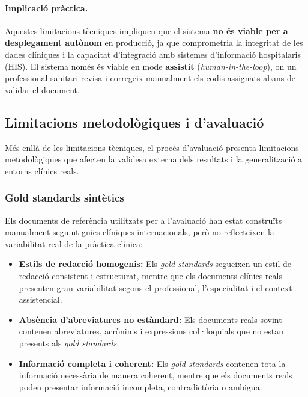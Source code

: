\documentclass[CAT]{TFUOC}%
\begin{document}
\paragraph{Implicació pràctica.}
Aquestes limitacions tècniques impliquen que el sistema \textbf{no és viable per a desplegament autònom} en producció, ja que comprometria la integritat de les dades clíniques i la capacitat d'integració amb sistemes d'informació hospitalaris (HIS). El sistema només és viable en mode \textbf{assistit} (\textit{human-in-the-loop}), on un professional sanitari revisa i corregeix manualment els codis assignats abans de validar el document.

\subsection{Limitacions metodològiques i d'avaluació}

Més enllà de les limitacions tècniques, el procés d'avaluació presenta limitacions metodològiques que afecten la validesa externa dels resultats i la generalització a entorns clínics reals.

\subsubsection{Gold standards sintètics}

Els documents de referència utilitzats per a l'avaluació han estat construïts manualment seguint guies clíniques internacionals, però no reflecteixen la variabilitat real de la pràctica clínica:

\begin{itemize}
    \item \textbf{Estils de redacció homogenis:} Els \textit{gold standards} segueixen un estil de redacció consistent i estructurat, mentre que els documents clínics reals presenten gran variabilitat segons el professional, l'especialitat i el context assistencial.
    
    \item \textbf{Absència d'abreviatures no estàndard:} Els documents reals sovint contenen abreviatures, acrònims i expressions col·loquials que no estan presents als \textit{gold standards}.
    
    \item \textbf{Informació completa i coherent:} Els \textit{gold standards} contenen tota la informació necessària de manera coherent, mentre que els documents reals poden presentar informació incompleta, contradictòria o ambigua.
\end{itemize}
\end{document}
